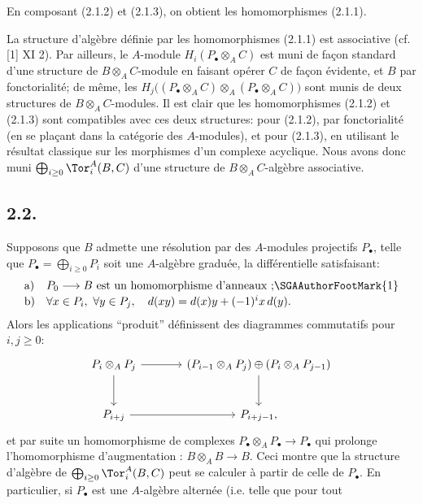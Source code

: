 

En
composant (2.1.2) et (2.1.3), on obtient les homomorphismes (2.1.1).

La structure d'algèbre définie par les homomorphismes (2.1.1) est associative (cf. [1] XI 2). Par ailleurs, le \(A\)-module \(H_i(P_\bullet\otimes_A C)\) est muni de façon standard d'une structure de \(B\otimes_A C\)-module en faisant opérer \(C\) de façon évidente, et \(B\) par fonctorialité; de même, les \(H_j\bigl((P_\bullet\otimes_A C)\otimes_A(P_\bullet\otimes_A C)\bigr)\) sont munis de deux structures de \(B\otimes_A C\)-modules. Il est clair que les homomorphismes (2.1.2) et (2.1.3) sont compatibles avec ces deux structures: pour (2.1.2), par fonctorialité (en se plaçant dans la catégorie des \(A\)-modules), et pour (2.1.3), en utilisant le résultat classique sur les morphismes d'un complexe acyclique. Nous avons donc muni \(\bigoplus_{i\ge0}\Tor_i^A(B,C)\) d'une structure de \(B\otimes_A C\)-algèbre associative.

\subsection*{2.2.}
Supposons que \(B\) admette une résolution par des \(A\)-modules projectifs \(P_\bullet\), telle que \(P_\bullet=\bigoplus_{i\ge0}P_i\) soit une \(A\)-algèbre graduée, la différentielle satisfaisant:
\[
\begin{array}{ll}
\text{a)}& P_0\longrightarrow B\text{ est un homomorphisme d'anneaux~;}\SGAAuthorFootMark{1}\\[0.4ex]
\text{b)}& \forall x\in P_i,\ \forall y\in P_j,\quad d(xy)=d(x)y+(-1)^i x\,d(y).
\end{array}
\]
Alors les applications ``produit'' définissent des diagrammes commutatifs pour \(i,j\ge0\):
\begin{equation}\notag
\begin{tikzcd}[column sep=large,row sep=large]
P_i\otimes_A P_j \arrow[r] \arrow[d] & (P_{i-1}\otimes_A P_j)\oplus(P_i\otimes_A P_{j-1}) \arrow[d]\\
P_{i+j} \arrow[r] & P_{i+j-1},
\end{tikzcd}
\end{equation}
et par suite un homomorphisme de complexes \(P_\bullet\otimes_A P_\bullet\to P_\bullet\) qui prolonge l'homomorphisme d'augmentation : \(B\otimes_A B\to B\). Ceci montre que la structure d'algèbre de \(\bigoplus_{i\ge0}\Tor_i^A(B,C)\) peut se calculer à partir de celle de \(P_\bullet\). En particulier, si \(P_\bullet\) est une \(A\)-algèbre alternée (i.e. telle que pour tout

